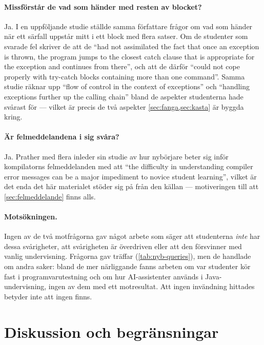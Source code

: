 \paragraph{Missförstår de vad som händer med resten av blocket?}
Ja.  I en uppföljande studie ställde samma författare frågor om vad som
händer när ett särfall uppstår mitt i ett block med flera satser.  Om de
studenter som svarade fel skriver de att de \enquote{had not assimilated
the fact that once an exception is thrown, the program jumps to the
closest catch clause that is appropriate for the exception and continues
from there}, och att de därför \enquote{could not cope properly with
try-catch blocks containing more than one
command}\autocite[343]{RashkovitsLavy2012}.  Samma studie räknar upp
\enquote{flow of control in the context of exceptions} och
\enquote{handling exceptions further up the calling chain} bland de
aspekter studenterna hade svårast
för\autocite[350]{RashkovitsLavy2012} --- vilket är precis de två
aspekter \cref{sec:fanga,sec:kasta} är byggda kring.

\paragraph{Är felmeddelandena i sig svåra?}
Ja.  Prather med flera inleder sin studie av hur nybörjare beter sig
inför kompilatorns felmeddelanden med att \enquote{the difficulty in
understanding compiler error messages can be a major impediment to
novice student learning}\autocite{Prather2017CEM}, vilket är det enda
det här materialet stöder sig på från den källan --- motiveringen till
att \cref{sec:felmeddelande} finns alls.

\paragraph{Motsökningen.}
Ingen av de två motfrågorna gav något arbete som säger att studenterna
\emph{inte} har dessa svårigheter, att svårigheten är överdriven eller
att den försvinner med vanlig undervisning.  Frågorna gav träffar
(\cref{tab:nyb-queries}), men de handlade om andra saker: bland de mer
närliggande fanns arbeten om var studenter kör fast i
programvarutestning och om hur AI-assistenter används i
Java-undervisning, ingen av dem med ett motresultat.  Att ingen
invändning hittades betyder inte att ingen finns.

\section{Diskussion och begränsningar}
\label{sec:nyb-diskussion}


